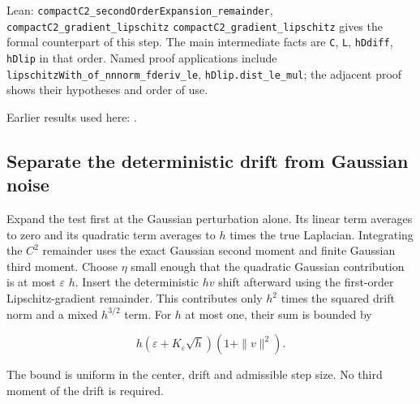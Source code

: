 \documentclass[11pt,a4paper]{report}
\begin{document}
\begin{leanbox}{Lean: \texttt{compactC2\_\allowbreak{}secondOrderExpansion\_\allowbreak{}remainder}, \texttt{compactC2\_\allowbreak{}gradient\_\allowbreak{}lipschitz}}
\texttt{compact\allowbreak{}C2\_\allowbreak{}gradient\_\allowbreak{}lipschitz} gives the formal counterpart of this step. The main intermediate facts are \texttt{C}, \texttt{L}, \texttt{h\allowbreak{}Ddiff}, \texttt{h\allowbreak{}Dlip} in that order. Named proof applications include \texttt{lipschitz\allowbreak{}With\_\allowbreak{}of\_\allowbreak{}nnnorm\_\allowbreak{}fderiv\_\allowbreak{}le}, \texttt{h\allowbreak{}Dlip.\allowbreak{}dist\_\allowbreak{}le\_\allowbreak{}mul}; the adjacent proof shows their hypotheses and order of use.
\end{leanbox}


Earlier results used here: \cite[Section~3.55.1]{LangevinLean2026ULASC}.
\subsection{\texorpdfstring{Separate the deterministic drift from Gaussian noise}{Separate the deterministic drift from Gaussian noise}}
\label{report-step-AverageLMC-CompactC2Taylor-lean-3}


Expand the test first at the Gaussian perturbation alone. Its linear term averages to zero and its quadratic term averages to \(h\) times the true Laplacian. Integrating the \(C^{2}\) remainder uses the exact Gaussian second moment and finite Gaussian third moment. Choose \(\eta\) small enough that the quadratic Gaussian contribution is at most \(\varepsilon\) \(h\). Insert the deterministic \(hv\) shift afterward using the first-order Lipschitz-gradient remainder. This contributes only \(h^2\) times the squared drift norm and a mixed \(h^{3/2}\) term. For \(h\) at most one, their sum is bounded by

\[h(\varepsilon+K_\varepsilon\sqrt h)(1+\|v\|^2).\]

The bound is uniform in the center, drift and admissible step size. No third moment of the drift is required.
\end{document}

